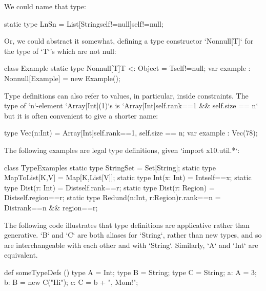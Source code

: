 We could name that type: 
% 
\begin{xten}
static type LnSn = List[String{self!=null}]{self!=null};
\end{xten}
Or, we could abstract it somewhat, defining a type constructor
\xcd`Nonnull[T]` for the type of \xcd`T`'s which are not null:
% 
\begin{xten}
class Example {
  static type Nonnull[T]{T <: Object}  = T{self!=null};
  var example : Nonnull[Example] = new Example();
}
\end{xten}
%

Type definitions can also refer to values, in particular, inside 
constraints.  The type of \xcd`n`-element \xcd`Array[Int](1)`s  is 
\xcd`Array[Int]{self.rank==1 && self.size == n}`
but it is often convenient to give a shorter name: 
\begin{xten}
type Vec(n:Int) = Array[Int]{self.rank==1, self.size == n}; 
var example : Vec(78); 
\end{xten}

%
The following examples are legal type definitions, given \xcd`import x10.util.*`:
\begin{xten}
class TypeExamples {
  static type StringSet = Set[String];
  static type MapToList[K,V] = Map[K,List[V]];
  static type Int(x: Int) = Int{self==x};
  static type Dist(r: Int) = Dist{self.rank==r};
  static type Dist(r: Region) = Dist{self.region==r};
  static type Redund(n:Int, r:Region){r.rank==n} 
      = Dist{rank==n && region==r};
}
\end{xten}
% 

The following code illustrates that type definitions are applicative rather
than generative.  \xcd`B` and \xcd`C` are both aliases for \xcd`String`,
rather than new types, and so are interchangeable with each other and with
\xcd`String`. Similarly, \xcd`A` and \xcd`Int` are equivalent.
\begin{xten}
def someTypeDefs () {
  type A = Int;
  type B = String;
  type C = String;
  a: A = 3;
  b: B = new C("Hi");
  c: C = b + ", Mom!";
  }
\end{xten}



